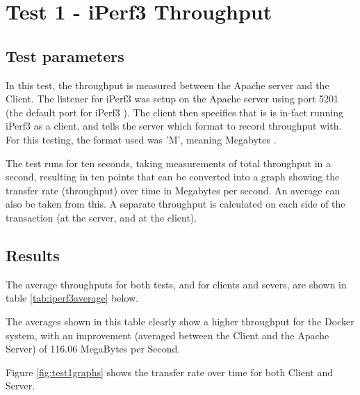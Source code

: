\section{Test 1 - iPerf3 Throughput}
\subsection{Test parameters}
In this test, the throughput is measured between the Apache server and the Client. The listener for iPerf3 was setup on the Apache server using port 5201 (the default port for iPerf3 \citep{iPerf3Documentation}). The client then specifies that is is in-fact running iPerf3 as a client, and tells the server which format to record throughput with. For this testing, the format used was 'M', meaning Megabytes \citep{iPerf3Documentation}.

The test runs for ten seconds, taking measurements of total throughput in a second, resulting in ten points that can be converted into a graph showing the transfer rate (throughput) over time in Megabytes per second. An average can also be taken from this. A separate throughput is calculated on each side of the transaction (at the server, and at the client).
 
\subsection{Results}
\label{test1results}
The average throughputs for both tests, and for clients and severs, are shown in table \ref{tab:iperf3average} below.

\begin{table}[h]
\centering
\caption{Table showing the average transfer rate in a 10 second period}
\label{tab:iperf3average}
\end{table}

The averages shown in this table clearly show a higher throughput for the Docker system, with an improvement (averaged between the Client and the Apache Server) of 116.06 MegaBytes per Second.

Figure \ref{fig:test1graphs} shows the transfer rate over time for both Client and Server.

